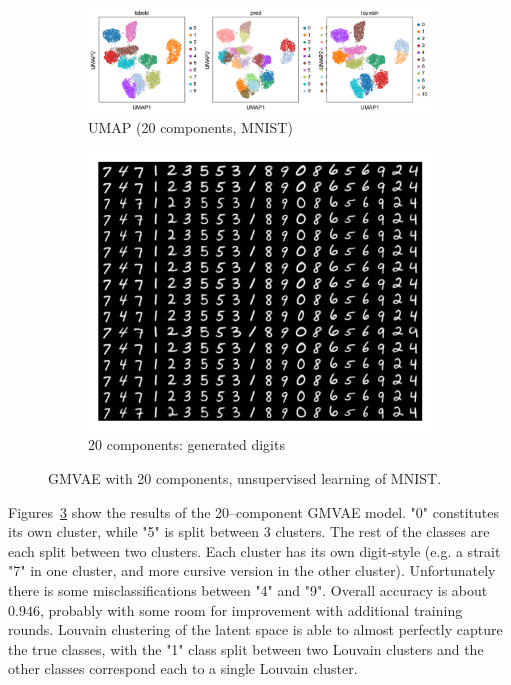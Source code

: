\documentclass[11pt, a4paper]{report}
\theoremstyle{plain}
\theoremstyle{definition}
\theoremstyle{remark}
\begin{document}
\begin{figure}[h]
\centering
\begin{subfigure}[b]{1.01\textwidth}
\includegraphics[width=\textwidth]{images/gmmvae_mnist_us_20c_umap4.png}
\caption{UMAP (20 components, MNIST)}
\label{fig:mnist_us_20c_latent}
\end{subfigure}
\begin{subfigure}[b]{0.5\textwidth}
\includegraphics[width=\textwidth]{images/gmmvae_mnist_us_20c_samples4.png}
\caption{20 components: generated digits}
\label{fig:mnist_us_20c_samples}
\end{subfigure}
\caption{GMVAE with 20 components, unsupervised learning of MNIST.}
\label{fig:mnist_us_20}
\end{figure}

Figures~\ref{fig:mnist_us_20} show the results of the 20--component GMVAE
model. "0" constitutes its own cluster, while "5" is split between 3 clusters.
The rest of the classes are each split between two clusters. Each cluster has
its own digit-style (e.g. a strait "7" in one cluster, and more cursive version
in the other cluster). Unfortunately there is some misclassifications between
"4" and "9". Overall accuracy is about $0.946$, probably with some room for
improvement with additional training rounds. Louvain clustering of the latent
space is able to almost perfectly capture the true classes, with the "1" class
split between two Louvain clusters and the other classes correspond each to a
single Louvain cluster.
\end{document}
